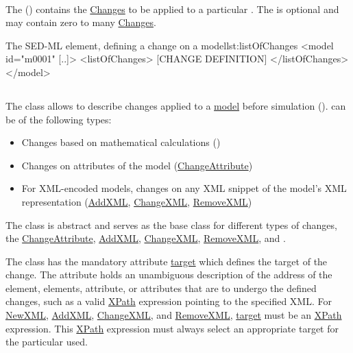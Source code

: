 \paragraph*{}
\label{sec:changesModel}
The  () contains the \hyperref[class:change]{Changes} to be applied to a particular \Model. The  is optional and may contain zero to many \hyperref[class:change]{Changes}.

\begin{myXmlLst}{The SED-ML  element, defining a change on a model}{lst:listOfChanges}
<model id="m0001" [..]>
	<listOfChanges>
		[CHANGE DEFINITION]
	</listOfChanges>
</model>
\end{myXmlLst}

\subsection{}
\label{class:change}
The  class allows to describe changes applied to a \hyperref[class:model]{model} before simulation ().  can be of the following types:
\begin{itemize}
	\item{Changes based on mathematical calculations (\ComputeChange)} 
	\item{Changes on attributes of the model (\hyperref[class:changeAttribute]{ChangeAttribute})}
	\item{For XML-encoded models, changes on any XML snippet of the model's XML representation (\hyperref[class:addXml]{AddXML}, \hyperref[class:changeXml]{ChangeXML}, \hyperref[class:removeXml]{RemoveXML})}
\end{itemize}

The  class is abstract and serves as the base class for different types of changes, the \hyperref[class:changeAttribute]{ChangeAttribute}, \hyperref[class:addXml]{AddXML}, \hyperref[class:changeXml]{ChangeXML}, \hyperref[class:removeXml]{RemoveXML}, and \ComputeChange.

The  class has the mandatory attribute \hyperref[sec:changeTarget]{target} which defines the target of the change. The \hyperref[sec:changeTarget]{} attribute holds an unambiguous description of the address of the element, elements, attribute, or attributes that are to undergo the defined changes, such as a valid \hyperref[sec:xpath]{XPath} expression pointing to the specified XML. For \hyperref[sec:newXml]{NewXML}, \hyperref[class:addXml]{AddXML}, \hyperref[class:changeXml]{ChangeXML}, and \hyperref[class:removeXml]{RemoveXML}, \hyperref[sec:changeTarget]{target} must be an \hyperref[sec:xpath]{XPath} expression. This \hyperref[sec:xpath]{XPath} expression must always select an appropriate target for the particular \Change used.


